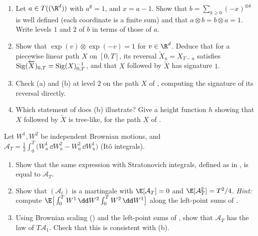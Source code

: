 \begin{exercise}\label{ex:sig-reversal}
\medium
\begin{enumerate}[label=(\alph*)]
  \item Let $a\in T((\R^d))$ with $a^\emptyset=1$, and $x=a-1$. Show that $b=\sum_{k\ge0}(-x)^{\otimes k}$ is well defined
    (each coordinate is a finite sum) and that $a\otimes b=b\otimes a=1$. Write levels $1$ and $2$ of $b$ in terms of
    those of $a$.
  \item Show that $\exp(v)\otimes\exp(-v)=1$ for $v\in\R^d$. Deduce that for a piecewise linear path $X$ on
    $[0,T]$, its reversal $\overleftarrow X_u=X_{T-u}$ satisfies
    $\operatorname{Sig}(\overleftarrow X)_{0,T}=\operatorname{Sig}(X)_{0,T}^{-1}$, and that $X$ followed by $\overleftarrow X$ has signature $1$.
  \item Check (a) and (b) at level $2$ on the path $X$ of , computing the signature of its
    reversal directly.
  \item Which statement of  does (b) illustrate? Give a height function $h$ showing that
    $X$ followed by $\overleftarrow X$ is tree-like, for the path $X$ of .
\end{enumerate}
\end{exercise}

\begin{exercise}\label{ex:sig-levy-area}
\medium Let $W^1,W^2$ be independent Brownian motions, and
$\mathcal A_T=\frac12\int_0^T\big(W^1_u\,\dd W^2_u-W^2_u\,\dd W^1_u\big)$ (It\^o integrals).
\begin{enumerate}[label=(\alph*)]
  \item Show that the same expression with Stratonovich integrals, defined as in , is equal
    to $\mathcal A_T$.
  \item Show that $(\mathcal A_t)$ is a martingale with $\E[\mathcal A_T]=0$ and $\E[\mathcal A_T^2]=T^2/4$.
    \emph{Hint:} compute $\E\big[\int_0^TW^1\,\dd W^2\int_0^TW^2\,\dd W^1\big]$ along the left-point sums of
    .
  \item Using Brownian scaling () and the left-point sums of
    , show that $\mathcal A_T$ has the law of $T\mathcal A_1$. Check that this is consistent
    with (b).
\end{enumerate}
\end{exercise}

